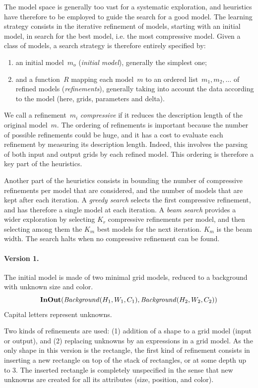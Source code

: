 \documentclass[a4paper]{llncs}
\begin{document}
The model space is generally too vast for a systematic exploration,
and heuristics have therefore to be employed to guide the search for a
good model.
%
The learning strategy consists in the iterative refinement of models,
starting with an initial model, in search for the best model, i.e. the
most compressive model. Given a class of models, a search strategy is
therefore entirely specified by:
\begin{enumerate}
\item an initial model~$m_o$ ({\em initial model}), generally the
  simplest one;
\item and a function~$R$ mapping each model~$m$ to an ordered
  list~$m_1, m_2, \ldots$ of refined models ({\em refinements}),
  generally taking into account the data according to the model (here,
  grids, parameters and delta).
\end{enumerate}
We call a refinement~$m_i$ {\em compressive} if it reduces the
description length of the original model~$m$. The ordering of
refinements is important because the number of possible refinements
could be huge, and it has a cost to evaluate each refinement by
measuring its description length. Indeed, this involves the parsing of
both input and output grids by each refined model.  This ordering is
therefore a key part of the heuristics.

Another part of the heuristics consists in bounding the number of
compressive refinements per model that are considered, and the number
of models that are kept after each iteration. A {\em greedy search}
selects the first compressive refinement, and has therefore a single
model at each iteration. A {\em beam search} provides a wider
exploration by selecting $K_r$ compressive refinements per model, and
then selecting among them the $K_m$ best models for the next
iteration. $K_m$ is the beam width. The search halts when no
compressive refinement can be found.

\paragraph{Version 1.} The initial model is made of two minimal grid
models, reduced to a background with unknown size and color.
\[ {\bf InOut}({\it Background}(H_1,W_1,C_1), {\it
    Background}(H_2,W_2,C_2)) \] Capital letters represent unknowns.

Two kinds of refinements are used: (1) addition
of a shape to a grid model (input or output), and (2) replacing
unknowns by an expressions in a grid model. As the only shape in this
version is the rectangle, the first kind of refinement consists in
inserting a new rectangle on top of the stack of rectangles, or at
some depth up to 3. The inserted rectangle is completely unspecified
in the sense that new unknowns are created for all its attributes
(size, position, and color).
\end{document}
